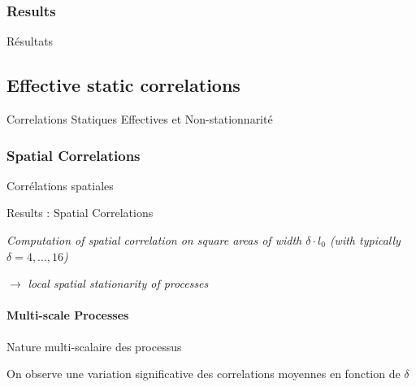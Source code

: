 \subsubsection{Results}{Résultats}








\subsection{Effective static correlations}{Correlations Statiques Effectives et Non-stationnarité}



\subsubsection{Spatial Correlations}{Corrélations spatiales}




Results : Spatial Correlations

\textit{Computation of spatial correlation on square areas of width $\delta\cdot l_0$ (with typically $\delta = 4, \ldots , 16$)}



$\rightarrow$ \textit{local spatial stationarity of processes}



% 



\paragraph{Multi-scale Processes}{Nature multi-scalaire des processus}



On observe une variation significative des correlations moyennes en fonction de $\delta$

